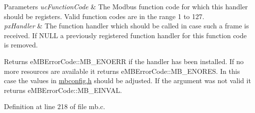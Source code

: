 \begin{DoxyParams}{Parameters}
{\em uc\+Function\+Code} & The Modbus function code for which this handler should be registers. Valid function codes are in the range 1 to 127. \\
\hline
{\em px\+Handler} & The function handler which should be called in case such a frame is received. If {\ttfamily N\+U\+LL} a previously registered function handler for this function code is removed.\\
\hline
\end{DoxyParams}
\begin{DoxyReturn}{Returns}
e\+M\+B\+Error\+Code\+::\+M\+B\+\_\+\+E\+N\+O\+E\+RR if the handler has been installed. If no more resources are available it returns e\+M\+B\+Error\+Code\+::\+M\+B\+\_\+\+E\+N\+O\+R\+ES. In this case the values in \hyperlink{mbconfig_8h_source}{mbconfig.\+h} should be adjusted. If the argument was not valid it returns e\+M\+B\+Error\+Code\+::\+M\+B\+\_\+\+E\+I\+N\+V\+AL. 
\end{DoxyReturn}


Definition at line 218 of file mb.\+c.

